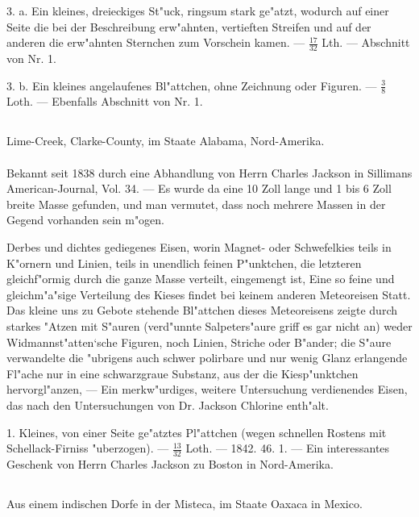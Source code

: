 \documentclass[a4paper, 11pt, oneside, polutonikogreek, german]{article}
\begin{document}
3. a. Ein kleines, dreieckiges St"uck, ringsum stark ge"atzt, wodurch auf einer Seite die bei der Beschreibung erw"ahnten, vertieften Streifen und auf der anderen die erw"ahnten Sternchen zum Vorschein kamen. --- $\frac{17}{32}$ Lth. --- Abschnitt von Nr. 1.

3. b. Ein kleines angelaufenes Bl"attchen, ohne Zeichnung oder Figuren. --- $\frac{3}{8}$ Loth. --- Ebenfalls Abschnitt von Nr. 1.
\subsection{}
\begin{center}

Lime-Creek, Clarke-County, im Staate Alabama, Nord-Amerika.
\end{center}
\paragraph{}
Bekannt seit 1838 durch eine Abhandlung von Herrn Charles Jackson in Sillimans American-Journal, Vol. 34. --- Es wurde da eine 10 Zoll lange und 1 bis 6 Zoll breite Masse gefunden, und man vermutet, dass noch mehrere Massen in der Gegend vorhanden sein m"ogen.

Derbes und dichtes gediegenes Eisen, worin Magnet- oder Schwefelkies teils in K"ornern und Linien, teils in unendlich feinen P"unktchen, die letzteren gleichf"ormig durch die ganze Masse verteilt, eingemengt ist, Eine so feine und gleichm"a"sige Verteilung des Kieses findet bei keinem anderen Meteoreisen Statt. Das kleine uns zu Gebote stehende Bl"attchen dieses Meteoreisens zeigte durch starkes "Atzen mit S"auren (verd"unnte Salpeters"aure griff es gar nicht an) weder Widmannst"atten‘sche Figuren, noch Linien, Striche oder B"ander; die S"aure verwandelte die "ubrigens auch schwer polirbare und nur wenig Glanz erlangende Fl"ache nur in eine schwarzgraue Substanz, aus der die Kiesp"unktchen hervorgl"anzen, --- Ein merkw"urdiges, weitere Untersuchung verdienendes Eisen, das nach den Untersuchungen von Dr. Jackson Chlorine enth"alt.

1. Kleines, von einer Seite ge"atztes Pl"attchen (wegen schnellen Rostens mit Schellack-Firniss "uberzogen). --- $\frac{13}{32}$ Loth. --- 1842. 46. 1. --- Ein interessantes Geschenk von Herrn Charles Jackson zu Boston in Nord-Amerika.
\subsection{}
\begin{center}

Aus einem indischen Dorfe in der Misteca, im Staate Oaxaca in Mexico.
\end{center}
\end{document}
